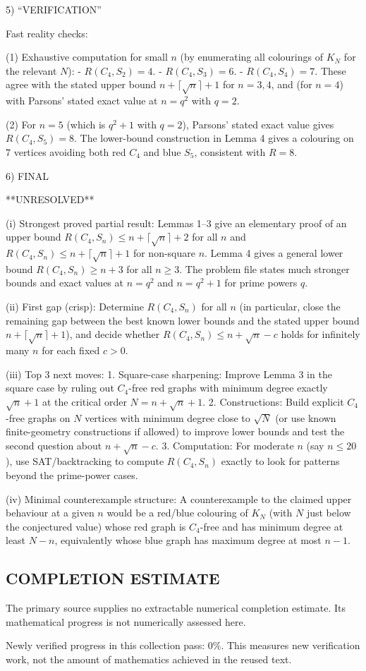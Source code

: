 5) “VERIFICATION”

Fast reality checks:

(1) Exhaustive computation for small $n$ (by enumerating all colourings of $K_N$ for the relevant $N$):
- $R(C_4,S_2)=4$.
- $R(C_4,S_3)=6$.
- $R(C_4,S_4)=7$.
These agree with the stated upper bound $n+\lceil\sqrt n\rceil+1$ for $n=3,4$, and (for $n=4$) with Parsons' stated exact value at $n=q^2$ with $q=2$.

(2) For $n=5$ (which is $q^2+1$ with $q=2$), Parsons' stated exact value gives $R(C_4,S_5)=8$. The lower-bound construction in Lemma 4 gives a colouring on $7$ vertices avoiding both red $C_4$ and blue $S_5$, consistent with $R=8$.

6) FINAL

**UNRESOLVED**

(i) Strongest proved partial result: Lemmas 1–3 give an elementary proof of an upper bound $R(C_4,S_n)\le n+\lceil\sqrt n\rceil+2$ for all $n$ and $R(C_4,S_n)\le n+\lceil\sqrt n\rceil+1$ for non-square $n$. Lemma 4 gives a general lower bound $R(C_4,S_n)\ge n+3$ for all $n\ge 3$. The problem file states much stronger bounds and exact values at $n=q^2$ and $n=q^2+1$ for prime powers $q$.

(ii) First gap (crisp): Determine $R(C_4,S_n)$ for all $n$ (in particular, close the remaining gap between the best known lower bounds and the stated upper bound $n+\lceil\sqrt n\rceil+1$), and decide whether $R(C_4,S_n)\le n+\sqrt n - c$ holds for infinitely many $n$ for each fixed $c>0$.

(iii) Top 3 next moves:
1. Square-case sharpening: Improve Lemma 3 in the square case by ruling out $C_4$-free red graphs with minimum degree exactly $\sqrt n +1$ at the critical order $N=n+\sqrt n +1$.
2. Constructions: Build explicit $C_4$-free graphs on $N$ vertices with minimum degree close to $\sqrt N$ (or use known finite-geometry constructions if allowed) to improve lower bounds and test the second question about $n+\sqrt n-c$.
3. Computation: For moderate $n$ (say $n\le 20$), use SAT/backtracking to compute $R(C_4,S_n)$ exactly to look for patterns beyond the prime-power cases.

(iv) Minimal counterexample structure: A counterexample to the claimed upper behaviour at a given $n$ would be a red/blue colouring of $K_{N}$ (with $N$ just below the conjectured value) whose red graph is $C_4$-free and has minimum degree at least $N-n$, equivalently whose blue graph has maximum degree at most $n-1$.



\subsection*{COMPLETION ESTIMATE}
The primary source supplies no extractable numerical completion estimate. Its mathematical progress is not numerically assessed here.

Newly verified progress in this collection pass: $0\%$. This measures new verification work, not the amount of mathematics achieved in the reused text.
